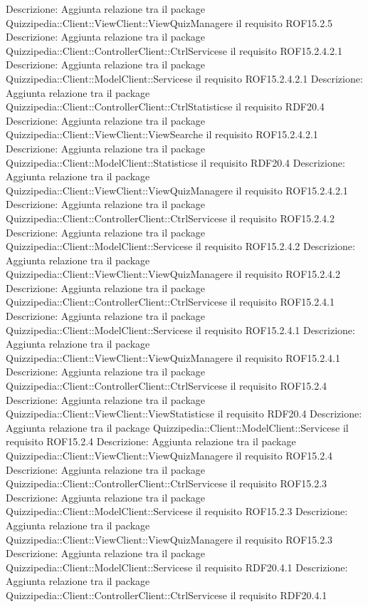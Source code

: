 Descrizione: Aggiunta relazione tra il package Quizzipedia::Client::ViewClient::ViewQuizManagere il requisito ROF15.2.5 
Descrizione: Aggiunta relazione tra il package Quizzipedia::Client::ControllerClient::CtrlServicese il requisito ROF15.2.4.2.1 
Descrizione: Aggiunta relazione tra il package Quizzipedia::Client::ModelClient::Servicese il requisito ROF15.2.4.2.1 
Descrizione: Aggiunta relazione tra il package Quizzipedia::Client::ControllerClient::CtrlStatisticse il requisito RDF20.4 
Descrizione: Aggiunta relazione tra il package Quizzipedia::Client::ViewClient::ViewSearche il requisito ROF15.2.4.2.1 
Descrizione: Aggiunta relazione tra il package Quizzipedia::Client::ModelClient::Statisticse il requisito RDF20.4 
Descrizione: Aggiunta relazione tra il package Quizzipedia::Client::ViewClient::ViewQuizManagere il requisito ROF15.2.4.2.1 
Descrizione: Aggiunta relazione tra il package Quizzipedia::Client::ControllerClient::CtrlServicese il requisito ROF15.2.4.2 
Descrizione: Aggiunta relazione tra il package Quizzipedia::Client::ModelClient::Servicese il requisito ROF15.2.4.2 
Descrizione: Aggiunta relazione tra il package Quizzipedia::Client::ViewClient::ViewQuizManagere il requisito ROF15.2.4.2 
Descrizione: Aggiunta relazione tra il package Quizzipedia::Client::ControllerClient::CtrlServicese il requisito ROF15.2.4.1 
Descrizione: Aggiunta relazione tra il package Quizzipedia::Client::ModelClient::Servicese il requisito ROF15.2.4.1 
Descrizione: Aggiunta relazione tra il package Quizzipedia::Client::ViewClient::ViewQuizManagere il requisito ROF15.2.4.1 
Descrizione: Aggiunta relazione tra il package Quizzipedia::Client::ControllerClient::CtrlServicese il requisito ROF15.2.4 
Descrizione: Aggiunta relazione tra il package Quizzipedia::Client::ViewClient::ViewStatisticse il requisito RDF20.4 
Descrizione: Aggiunta relazione tra il package Quizzipedia::Client::ModelClient::Servicese il requisito ROF15.2.4 
Descrizione: Aggiunta relazione tra il package Quizzipedia::Client::ViewClient::ViewQuizManagere il requisito ROF15.2.4 
Descrizione: Aggiunta relazione tra il package Quizzipedia::Client::ControllerClient::CtrlServicese il requisito ROF15.2.3 
Descrizione: Aggiunta relazione tra il package Quizzipedia::Client::ModelClient::Servicese il requisito ROF15.2.3 
Descrizione: Aggiunta relazione tra il package Quizzipedia::Client::ViewClient::ViewQuizManagere il requisito ROF15.2.3 
Descrizione: Aggiunta relazione tra il package Quizzipedia::Client::ModelClient::Servicese il requisito RDF20.4.1 
Descrizione: Aggiunta relazione tra il package Quizzipedia::Client::ControllerClient::CtrlServicese il requisito RDF20.4.1 
